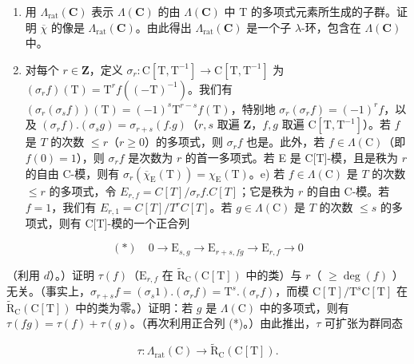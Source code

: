 \begin{enumerate}
\def\labelenumi{\alph{enumi})}
\setcounter{enumi}{2}
\item
  用 \(\Lambda_{\mathrm{rat}}(\mathbf{C})\) 表示 \(\Lambda(\mathbf{C})\) 的由 \(\Lambda(\mathbf{C})\) 中 T 的多项式元素所生成的子群。证明 \(\overline{\chi}\) 的像是 \(\Lambda_{\mathrm{rat}}(\mathbf{C})\)。由此得出 \(\Lambda_{\mathrm{rat}}(\mathbf{C})\) 是一个子 \(\lambda\)-环，包含在 \(\Lambda(\mathbf{C})\) 中。
\item
  对每个 \(r \in \mathbf{Z}\)，定义 \(\sigma_r: \mathrm{C}[\mathrm{T}, \mathrm{T}^{-1}] \to \mathrm{C}[\mathrm{T}, \mathrm{T}^{-1}]\) 为 \((\sigma_r f)(\mathrm{T}) = \mathrm{T}^{r} f((-\mathrm{T})^{-1})\)。我们有 \((\sigma_r(\sigma_s f))(\mathrm{T}) = (-1)^s \mathrm{T}^{r-s} f(\mathrm{T})\)，特别地 \(\sigma_r(\sigma_r f) = (-1)^r f\)，以及 \((\sigma_r f).(\sigma_s g) = \sigma_{r+s}(f.g)\)（\(r, s\) 取遍 \(\mathbf{Z}\)，\(f, g\) 取遍 \(\mathrm{C}[\mathrm{T}, \mathrm{T}^{-1}]\)）。若 \(f\) 是 \(T\) 的次数 \(\leqslant r\)（\(r \geqslant 0\)）的多项式，则 \(\sigma_r f\) 也是。此外，若 \(f \in \Lambda(\mathrm{C})\)（即 \(f(0) = 1\)），则 \(\sigma_r f\) 是次数为 \(r\) 的首一多项式。若 E 是 C{[}T{]}-模，且是秩为 \(r\) 的自由 C-模，则有 \(\sigma_r(\overline{\chi}_{\mathrm{E}}(\mathrm{T})) = \chi_{\mathrm{E}}(\mathrm{T})\)。e) 若 \(f \in \Lambda(\mathrm{C})\) 是 \(T\) 的次数 \(\leqslant r\) 的多项式，令 \(E_{r,f} = C[T]/\sigma_r f.C[T]\)；它是秩为 \(r\) 的自由 C-模。若 \(f = 1\)，我们有 \(E_{r,1} = C[T]/T^{r}C[T]\)。若 \(g \in \Lambda(\mathrm{C})\) 是 \(T\) 的次数 \(\leqslant s\) 的多项式，则有 C{[}T{]}-模的一个正合列
\end{enumerate}

\[
(*) \quad 0 \rightarrow \mathrm{E} _ {s, g} \rightarrow \mathrm{E} _ {r + s, f g} \rightarrow \mathrm{E} _ {r, f} \rightarrow 0
\]

（利用 \(d\)）。）证明 \(\tau(f)\)（\(\mathrm{E}_{r,f}\) 在 \(\tilde{\mathrm{R}}_{\mathrm{C}}(\mathrm{C}[\mathrm{T}])\) 中的类）与 \(r\)（ \(\geqslant \deg(f)\) ）无关。（事实上，\(\sigma_{r+s}f = (\sigma_s1).(\sigma_rf) = \mathrm{T}^s.(\sigma_rf)\)，而模 \(\mathrm{C}[\mathrm{T}] / \mathrm{T}^s\mathrm{C}[\mathrm{T}]\) 在 \(\tilde{\mathrm{R}}_{\mathrm{C}}(\mathrm{C}[\mathrm{T}])\) 中的类为零。）证明：若 \(g\) 是 \(\Lambda(\mathrm{C})\) 中的多项式，则有 \(\tau(fg) = \tau(f) + \tau(g)\)。（再次利用正合列 (*)。）由此推出，\(\tau\) 可扩张为群同态

\[
\tau : \Lambda_ {\mathrm{rat}} (\mathrm{C}) \rightarrow \tilde {\mathrm{R}} _ {\mathrm{C}} (\mathrm{C} [ \mathrm{T} ]).
\]

